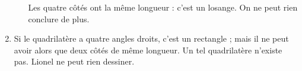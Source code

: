 \begin{enumerate}
\begin{enumerate}
Les quatre côtés ont la même longueur : c'est un losange. On ne peut rien conclure de plus.
	\end{enumerate}
\item Si le quadrilatère a quatre angles droits, c'est un rectangle ; mais il ne peut avoir alors que deux côtés de même longueur. Un tel quadrilatère n'existe pas. Lionel ne peut rien dessiner.
		 
%


\end{enumerate}

\bigskip

